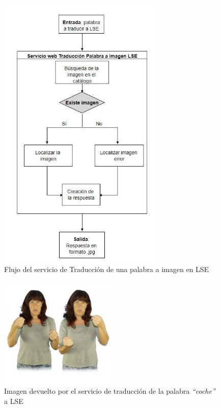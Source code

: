 \begin{figure}[]
	\centering
	\includegraphics[width=0.7\textwidth]{Imagenes/Fuentes/Text2LSE/FlujoImagen1palabra.jpg}
	\caption{Flujo del servicio de Traducción de una palabra a imagen en LSE}
	\label {fig: imgFlujo1palabraImagenText2LSE}
\end{figure}

\begin{figure}[]
	\centering
	\includegraphics[width=0.5\textwidth]{Imagenes/Fuentes/Text2LSE/imagenEjemplo.jpg}
	\caption{Imagen devuelto por el servicio de traducción de la palabra \textit{``coche''} a LSE}
	\label {fig: imgCoche}
\end{figure}


